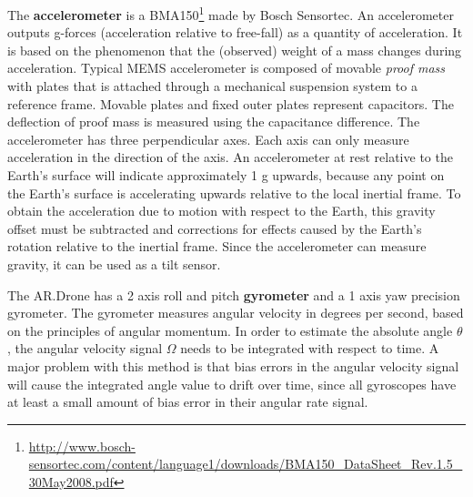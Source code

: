 The \textbf{accelerometer} is a BMA150\footnote{\url{http://www.bosch-sensortec.com/content/language1/downloads/BMA150_DataSheet_Rev.1.5_30May2008.pdf}} made by Bosch Sensortec.
An accelerometer outputs g-forces (acceleration relative to free-fall) as a quantity of acceleration.
It is based on the phenomenon that the (observed) weight of a mass changes during acceleration.
Typical MEMS accelerometer is composed of movable \textit{proof mass} with plates that is attached through a mechanical suspension system to a reference frame.
Movable plates and fixed outer plates represent capacitors. The deflection of proof mass is measured using the capacitance difference.
The accelerometer has three perpendicular axes. Each axis can only measure acceleration in the direction of the axis.
An accelerometer at rest relative to the Earth's surface will indicate approximately 1 g upwards, because any point on the Earth's surface is accelerating upwards relative to the local inertial frame.
To obtain the acceleration due to motion with respect to the Earth, this gravity offset must be subtracted and corrections for effects caused by the Earth's rotation relative to the inertial frame.
Since the accelerometer can measure gravity, it can be used as a tilt sensor.

The AR.Drone has a 2 axis roll and pitch \textbf{gyrometer} and a 1 axis yaw precision gyrometer.
The gyrometer measures angular velocity in degrees per second, based on the principles of angular momentum.
In order to estimate the absolute angle $\theta$, the angular velocity signal $\Omega$ needs to be integrated with respect to time.
A major problem with this method is that bias errors in the angular velocity signal will cause the integrated angle value to drift over time, since all gyroscopes have at least a small amount of bias error in their angular rate signal.

